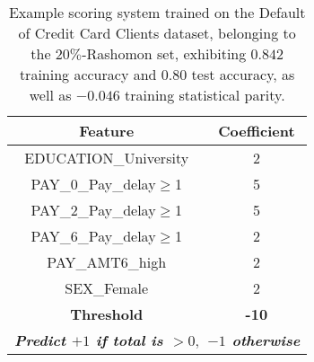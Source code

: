 \begin{table}[h!]
\centering
\caption{Example scoring system trained on the Default of Credit Card Clients dataset, belonging to the $20\%$-Rashomon set, exhibiting $0.842$ training accuracy and $0.80$ test accuracy, as well as $-0.046$ training statistical parity.}\label{tab:example_scoring_system}
\begin{tabular}{|cc|}
\hline
\multicolumn{1}{|c|}{\textbf{Feature}}           & \textbf{Coefficient}      \\ \hline
\multicolumn{1}{|c|}{EDUCATION\_University}       & 2                         \\ \hline
\multicolumn{1}{|c|}{PAY\_0\_Pay\_delay$\geq$1}   & 5                         \\ \hline
\multicolumn{1}{|c|}{PAY\_2\_Pay\_delay$\geq$1}   & 5                         \\ \hline
\multicolumn{1}{|c|}{PAY\_6\_Pay\_delay$\geq$1}   & 2                         \\ \hline
\multicolumn{1}{|c|}{PAY\_AMT6\_high}             & 2                         \\ \hline
\multicolumn{1}{|c|}{SEX\_Female}                 & 2                         \\ \hline
\multicolumn{1}{|c|}{\textbf{Threshold}}                  & \textbf{-10}                       \\ \hline
\multicolumn{2}{|c|}{\textit{\textbf{Predict $+1$ if total is $>0,$ $-1$ otherwise}}} \\ \hline
\end{tabular}
\end{table}